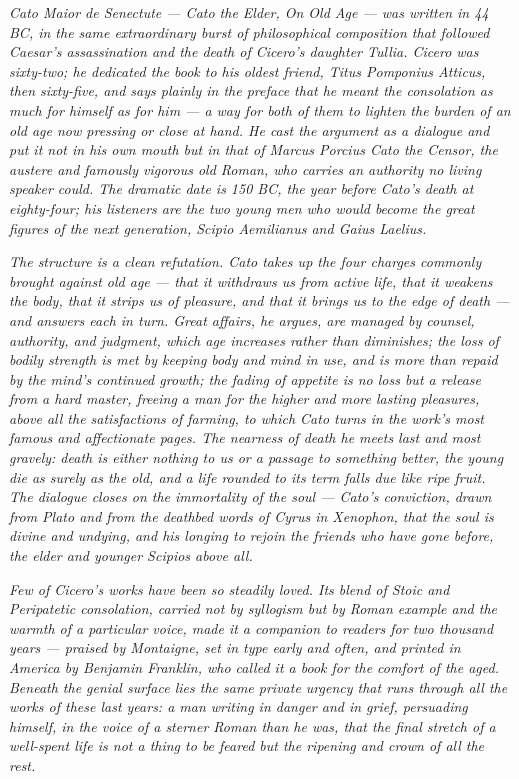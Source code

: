 
\textit{\textit{Cato Maior de Senectute} --- Cato the Elder, On Old
Age --- was written in 44 BC, in the same extraordinary burst of
philosophical composition that followed Caesar's assassination and the
death of Cicero's daughter Tullia. Cicero was sixty-two; he dedicated
the book to his oldest friend, Titus Pomponius Atticus, then sixty-five,
and says plainly in the preface that he meant the consolation as much
for himself as for him --- a way for both of them to lighten the burden
of an old age now pressing or close at hand. He cast the argument as a
dialogue and put it not in his own mouth but in that of Marcus Porcius
Cato the Censor, the austere and famously vigorous old Roman, who
carries an authority no living speaker could. The dramatic date is 150
BC, the year before Cato's death at eighty-four; his listeners are the
two young men who would become the great figures of the next
generation, Scipio Aemilianus and Gaius Laelius.}

\textit{The structure is a clean refutation. Cato takes up the four
charges commonly brought against old age --- that it withdraws us from
active life, that it weakens the body, that it strips us of pleasure,
and that it brings us to the edge of death --- and answers each in turn.
Great affairs, he argues, are managed by counsel, authority, and
judgment, which age increases rather than diminishes; the loss of bodily
strength is met by keeping body and mind in use, and is more than repaid
by the mind's continued growth; the fading of appetite is no loss but a
release from a hard master, freeing a man for the higher and more
lasting pleasures, above all the satisfactions of farming, to which
Cato turns in the work's most famous and affectionate pages. The
nearness of death he meets last and most gravely: death is either
nothing to us or a passage to something better, the young die as surely
as the old, and a life rounded to its term falls due like ripe fruit.
The dialogue closes on the immortality of the soul --- Cato's
conviction, drawn from Plato and from the deathbed words of Cyrus in
Xenophon, that the soul is divine and undying, and his longing to
rejoin the friends who have gone before, the elder and younger
Scipios above all.}

\textit{Few of Cicero's works have been so steadily loved. Its blend of
Stoic and Peripatetic consolation, carried not by syllogism but by
Roman example and the warmth of a particular voice, made it a companion
to readers for two thousand years --- praised by Montaigne, set in type
early and often, and printed in America by Benjamin Franklin, who called
it a book for the comfort of the aged. Beneath the genial surface lies
the same private urgency that runs through all the works of these last
years: a man writing in danger and in grief, persuading himself, in the
voice of a sterner Roman than he was, that the final stretch of a
well-spent life is not a thing to be feared but the ripening and
crown of all the rest.}

